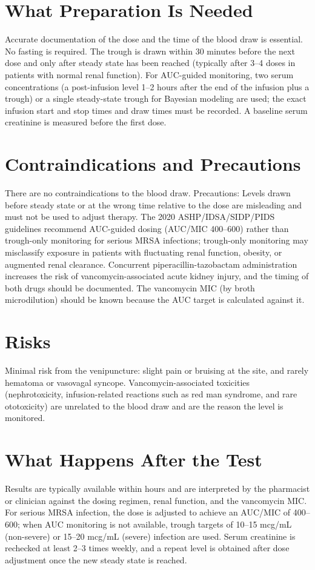 \section*{What Preparation Is Needed}
Accurate documentation of the dose and the time of the blood draw is essential. No fasting is required. The trough is drawn within 30 minutes before the next dose and only after steady state has been reached (typically after 3--4 doses in patients with normal renal function). For AUC-guided monitoring, two serum concentrations (a post-infusion level 1--2 hours after the end of the infusion plus a trough) or a single steady-state trough for Bayesian modeling are used; the exact infusion start and stop times and draw times must be recorded. A baseline serum creatinine is measured before the first dose.

\section*{Contraindications and Precautions}
There are no contraindications to the blood draw. Precautions: Levels drawn before steady state or at the wrong time relative to the dose are misleading and must not be used to adjust therapy. The 2020 ASHP/IDSA/SIDP/PIDS guidelines recommend AUC-guided dosing (AUC/MIC 400--600) rather than trough-only monitoring for serious MRSA infections; trough-only monitoring may misclassify exposure in patients with fluctuating renal function, obesity, or augmented renal clearance. Concurrent piperacillin-tazobactam administration increases the risk of vancomycin-associated acute kidney injury, and the timing of both drugs should be documented. The vancomycin MIC (by broth microdilution) should be known because the AUC target is calculated against it.

\section*{Risks}
Minimal risk from the venipuncture: slight pain or bruising at the site, and rarely hematoma or vasovagal syncope. Vancomycin-associated toxicities (nephrotoxicity, infusion-related reactions such as red man syndrome, and rare ototoxicity) are unrelated to the blood draw and are the reason the level is monitored.

\section*{What Happens After the Test}
Results are typically available within hours and are interpreted by the pharmacist or clinician against the dosing regimen, renal function, and the vancomycin MIC. For serious MRSA infection, the dose is adjusted to achieve an AUC/MIC of 400--600; when AUC monitoring is not available, trough targets of 10--15 mcg/mL (non-severe) or 15--20 mcg/mL (severe) infection are used. Serum creatinine is rechecked at least 2--3 times weekly, and a repeat level is obtained after dose adjustment once the new steady state is reached.

